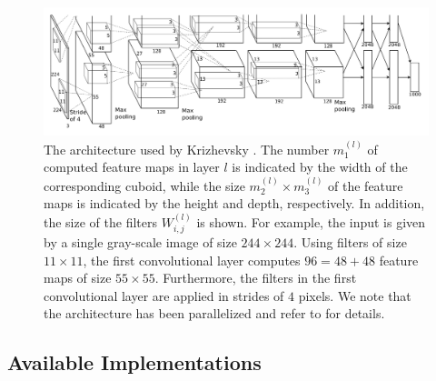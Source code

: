 \begin{figure}
	\centering
	\includegraphics[scale=0.4]{pictures/architecture}
	\caption{The architecture used by Krizhevsky \etal \cite{KrizhevskySutskeverHinton:2012}. The number $m_1^{(l)}$ of computed feature maps in layer $l$ is indicated by the width of the corresponding cuboid, while the size $m_2^{(l)} \times m_3^{(l)}$ of the feature maps is indicated by the height and depth, respectively. In addition, the size of the filters $W_{i,j}^{(l)}$ is shown. For example, the input is given by a single gray-scale image of size $244 \times 244$. Using filters of size $11 \times 11$, the first convolutional layer computes $96 = 48 + 48$ feature maps of size $55 \times 55$. Furthermore, the filters in the first convolutional layer are applied in strides of $4$ pixels. We note that the architecture has been parallelized and refer to \cite{KrizhevskySutskeverHinton:2012} for details.}
	\label{fig:architecture}
\end{figure}

\subsection{Available Implementations}
\label{sec:implementations}

